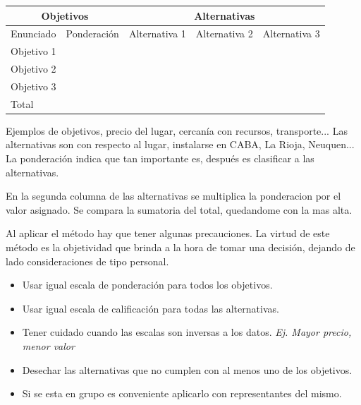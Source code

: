 \documentclass[titlepage,a4paper]{article}
\begin{document}
\begin{table}[!htb]
\begin{tabular}{|l|l|l|l|l|l|l|l|}
\hline
\multicolumn{2}{|c|}{Objetivos} & \multicolumn{6}{c|}{Alternativas}                                                                            \\ \hline
Enunciado      & Ponderación    & \multicolumn{2}{r|}{Alternativa 1} & \multicolumn{2}{r|}{Alternativa 2} & \multicolumn{2}{r|}{Alternativa 3} \\ \hline
Objetivo 1     &                & \multicolumn{1}{r|}{}      &       &                  &                 &                  &                 \\ \hline
Objetivo 2     &                &                            &       &                  &                 &                  &                 \\ \hline
Objetivo 3     &                &                            &       &                  &                 &                  &                 \\ \hline
\multicolumn{2}{|l|}{Total}     &                            &       &                  &                 &                  &                 \\ \hline
\end{tabular}
\end{table}

Ejemplos de objetivos, precio del lugar, cercanía con recursos, transporte...
Las alternativas son con respecto al lugar, instalarse en CABA, La Rioja, Neuquen...
La ponderación indica que tan importante es, después es clasificar a las alternativas.

En la segunda columna de las alternativas se multiplica la ponderacion por el valor asignado. Se compara la sumatoria del total, quedandome con la mas alta.


Al aplicar el método hay que tener algunas precauciones. La virtud de este método es la objetividad que brinda a la hora de tomar una decisión, dejando de lado
consideraciones de tipo personal. 
\begin{itemize}
    \item Usar igual escala de ponderación para todos los objetivos.
    \item Usar igual escala de calificación para todas las alternativas.
    \item Tener cuidado cuando las escalas son inversas a los datos. \textit{Ej. Mayor precio, menor valor}
    \item Desechar las alternativas que no cumplen con al menos uno de los objetivos.
    \item Si se esta en grupo es conveniente aplicarlo con representantes del mismo.
\end{itemize}
\end{document}
